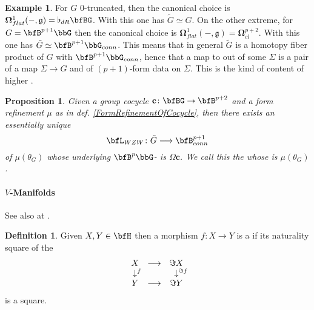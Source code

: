\documentclass[12pt,titlepage]{article}
\def\mathrlap{\mathpalette\mathrlapinternal}
\def\mathrlapinternal#1#2{\rlap{$\mathsurround=0pt#1{#2}$}}
\newcommand{\itexarray}[1]{\begin{matrix}#1\end{matrix}}
\theoremstyle{plain}
\newtheorem{prop}{Proposition}
\theoremstyle{definition}
\newtheorem{defn}{Definition}
\newtheorem{example}{Example}
\theoremstyle{remark}
\begin{document}
\begin{example}
\label{}\hypertarget{}{}
For $G$ 0-truncated, then the canonical choice is $\mathbf{\Omega}^1_{flat}(-,\mathfrak{g}) = \flat_{dR}\bfBG$. With this one has $\tilde G \simeq G$.
On the other extreme, for $G = \bfB^{p+1}\bbG$ then the canonical choice is $\mathbf{\Omega}^1_{flat}(-,\mathfrak{g}) = \mathbf{\Omega}^{p+2}_{cl}$. With this one has $\tilde G \simeq \bfB^{p+1}\bbG_{conn}$.
This means that in general $\tilde G$ is a homotopy fiber product of $G$ with $\bfB^{p+1}\bbG_{conn}$, hence that a map to out of some $\Sigma$ is a pair of a map $\Sigma \to G$ and of $(p+1)$-form data on $\Sigma$. This is the kind of  content of higher .
\end{example}
\begin{prop}
\label{WZWTermFromCocycle}\hypertarget{WZWTermFromCocycle}{}
Given a group cocycle $\mathbf{c} \colon \bfBG \to \bfB^{p+2}$ and a form refinement $\mu$ as in def. \ref{FormRefinementOfCocycle}, then there exists an essentially unique 
\begin{displaymath}
\bfL_{WZW}
\colon
\tilde G \longrightarrow \bfB^{p+1}_{conn}
\end{displaymath}
of $\mu(\theta_G)$ whose underlying $\bfB^p\bbG$- is $\Omega \mathbf{c}$.
We call this the  whose  is $\mu(\theta_G)$.
\end{prop}
\hypertarget{Manifolds}{}\paragraph*{{$V$-Manifolds}}\label{Manifolds}
See also at .
\begin{defn}
\label{LocalDiffeomorphisms}\hypertarget{LocalDiffeomorphisms}{}
Given $X,Y\in \bfH$ then a morphism $f \colon X\longrightarrow Y$ is a  if its naturality square of the 
\begin{displaymath}
\itexarray{
X &\longrightarrow& \Im X
\\
\downarrow^{\mathrlap{f}} && \downarrow^{\mathrlap{\Im f}}
\\
Y &\longrightarrow& \Im Y
}
\end{displaymath}
is a  square.
\end{defn}
\end{document}

